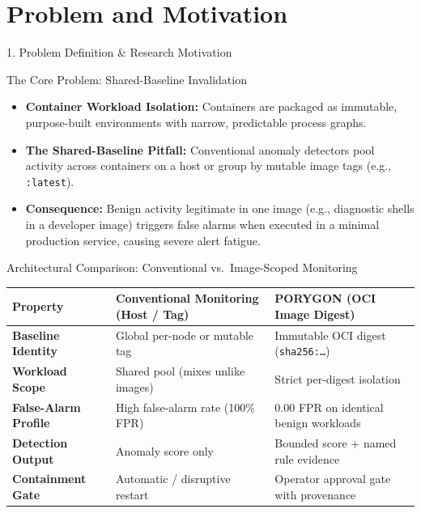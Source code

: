 \documentclass[aspectratio=169,10pt]{beamer}
\begin{document}
\section{Problem and Motivation}
\begin{frame}{1. Problem Definition \& Research Motivation}
\small

\begin{block}{The Core Problem: Shared-Baseline Invalidation}
\begin{itemize}\setlength{\itemsep}{3pt}
  \item \textbf{Container Workload Isolation:} Containers are packaged as immutable, purpose-built environments with narrow, predictable process graphs.
  \item \textbf{The Shared-Baseline Pitfall:} Conventional anomaly detectors pool activity across containers on a host or group by mutable image tags (e.g., \texttt{:latest}).
  \item \textbf{Consequence:} Benign activity legitimate in one image (e.g., diagnostic shells in a developer image) triggers false alarms when executed in a minimal production service, causing severe alert fatigue.
\end{itemize}
\end{block}

\vspace{0.08cm}

\begin{block}{Architectural Comparison: Conventional vs.\ Image-Scoped Monitoring}
\centering\renewcommand{\arraystretch}{1.1}\footnotesize
\begin{tabularx}{\textwidth}{>{\bfseries}p{2.6cm} X X}
\toprule
Property & Conventional Monitoring (Host / Tag) & PORYGON (OCI Image Digest) \\
\midrule
Baseline Identity   & Global per-node or mutable tag   & Immutable OCI digest (\texttt{sha256:\ldots}) \\
Workload Scope      & Shared pool (mixes unlike images)& Strict per-digest isolation \\
False-Alarm Profile & High false-alarm rate (100\% FPR)& 0.00 FPR on identical benign workloads \\
Detection Output    & Anomaly score only               & Bounded score + named rule evidence \\
Containment Gate    & Automatic / disruptive restart    & Operator approval gate with provenance \\
\bottomrule
\end{tabularx}
\end{block}
\end{frame}
\end{document}

